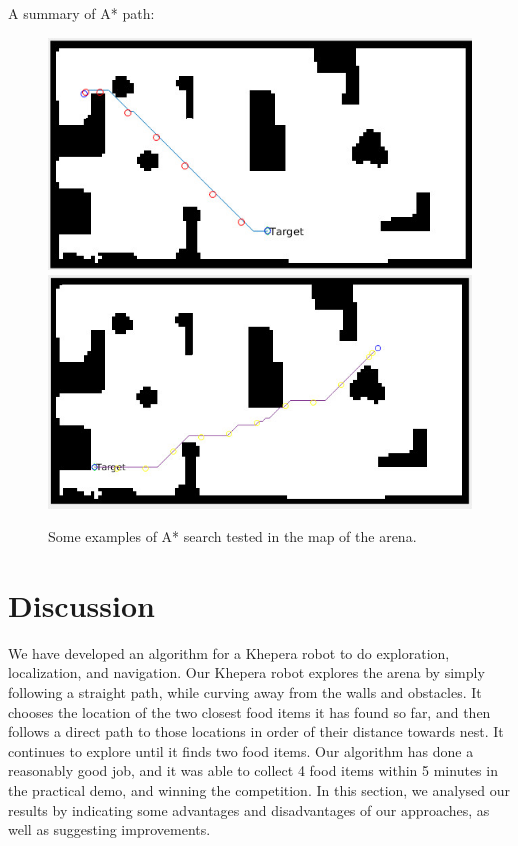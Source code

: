 \documentclass[]{article}
\begin{document}
A summary of A* path:
\begin{figure}[h]
 \includegraphics[scale=0.35]{A_4}
 \includegraphics[scale=0.3]{A_5}
 \centering
 \caption{Some examples of A* search tested in the map of the arena.}
\end{figure}
 

\section{Discussion}

We have developed an algorithm for a Khepera robot to do exploration, localization, and navigation. Our Khepera robot explores the arena by simply following a straight path, while curving away from the walls and obstacles. It chooses the location of the two closest food items it has found so far, and then follows a direct path to those locations in order of their distance towards nest. It continues to explore until it finds two food items. Our algorithm has done a reasonably good job, and it was able to collect 4 food items within 5 minutes in the practical demo, and winning the competition.  In this section, we analysed our results by indicating some advantages and disadvantages of our approaches, as well as suggesting improvements.
\end{document}
